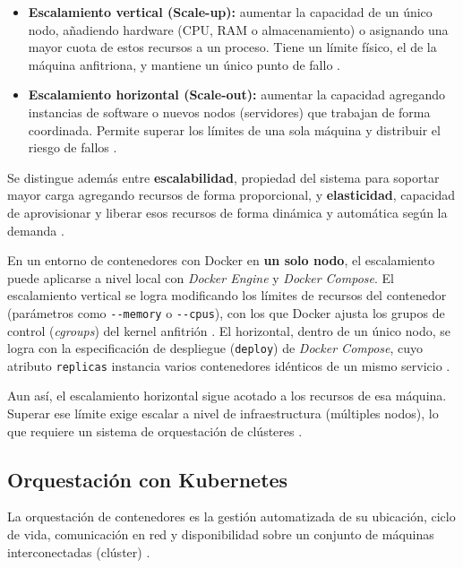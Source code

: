 \begin{itemize}
    \item \textbf{Escalamiento vertical (Scale-up):} aumentar la capacidad de un único nodo, añadiendo hardware (CPU, RAM o almacenamiento) o asignando una mayor cuota de estos recursos a un proceso. Tiene un límite físico, el de la máquina anfitriona, y mantiene un único punto de fallo \cite{kleppmann2017designing}.
    \item \textbf{Escalamiento horizontal (Scale-out):} aumentar la capacidad agregando instancias de software o nuevos nodos (servidores) que trabajan de forma coordinada. Permite superar los límites de una sola máquina y distribuir el riesgo de fallos \cite{kleppmann2017designing, vansteen2023distributed}.
\end{itemize}

Se distingue además entre \textbf{escalabilidad}, propiedad del sistema para soportar mayor carga agregando recursos de forma proporcional, y \textbf{elasticidad}, capacidad de aprovisionar y liberar esos recursos de forma dinámica y automática según la demanda \cite{vansteen2023distributed}.

En un entorno de contenedores con Docker en \textbf{un solo nodo}, el escalamiento puede aplicarse a nivel local con \textit{Docker Engine} y \textit{Docker Compose}. El escalamiento vertical se logra modificando los límites de recursos del contenedor (parámetros como \texttt{-\hspace{0pt}-memory} o \texttt{-\hspace{0pt}-cpus}), con los que Docker ajusta los grupos de control (\textit{cgroups}) del kernel anfitrión \cite{docker_resources_2024}. El horizontal, dentro de un único nodo, se logra con la especificación de despliegue (\texttt{deploy}) de \textit{Docker Compose}, cuyo atributo \texttt{replicas} instancia varios contenedores idénticos de un mismo servicio \cite{docker_compose_deploy_2024}.

Aun así, el escalamiento horizontal sigue acotado a los recursos de esa máquina. Superar ese límite exige escalar a nivel de infraestructura (múltiples nodos), lo que requiere un sistema de orquestación de clústeres \cite{pahl2017cloud}.

\subsection{Orquestación con Kubernetes}
\label{subsec:orquestacion_kubernetes}

La orquestación de contenedores es la gestión automatizada de su ubicación, ciclo de vida, comunicación en red y disponibilidad sobre un conjunto de máquinas interconectadas (clúster) \cite{pahl2017cloud}.

